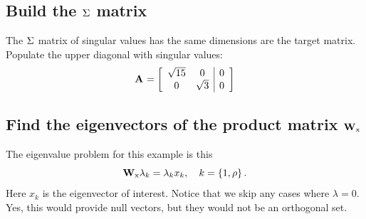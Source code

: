 \subsection{Build the $\sig{}$ matrix}
The $\sig{}$ matrix of singular values has the same dimensions are the target matrix. Populate the upper diagonal with singular values:
\begin{equation}
  \A{} = \mat{cc|c}
  {
  \sqrt{15} & 0 & 0 \\
  0 & \sqrt{3}  & 0
  }
\end{equation}

\subsection{Find the eigenvectors of the product matrix $\W{x}$}
The eigenvalue problem for this example is this
\begin{equation}
  \W{x}\lambda_{k} = \lambda_{k} x_{k}, \quad k=\lst{1,\rho}.
  \label{eq:raw:ev}
\end{equation}
Here $x_{k}$ is the eigenvector of interest. Notice that we skip any cases where $\lambda=0$. Yes, this would provide null vectors, but they would not be an orthogonal set.

